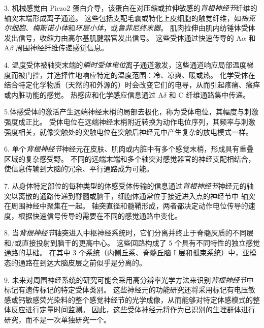 3. 机械感觉由 Piezo2 蛋白介导，该蛋白在对压缩或拉伸敏感的\textit{背根神经节}纤维的轴突末端形成离子通道。
这些包括支配毛囊或特化上皮细胞的触觉纤维，如\textit{梅克尔细胞}、\textit{梅斯诺小体}和\textit{环层小体}，或\textit{鲁菲尼终末器}。
肌肉拉伸由肌内纺锤体受体发出信号，收缩力由高尔基肌腱器官发出信号。
这些受体通过快速传导的 A$\alpha$ 和 A$\beta$ 周围神经纤维传递感觉信息。


4. 温度受体被轴突末端的\textit{瞬时受体电位}离子通道激发，这些通道响应局部温度梯度而被门控，并选择性地响应特定的温度范围：冷、凉爽、暖或热。
化学受体在结合特定化学物质（天然的和外源的）时会改变它们的电导，从而引起疼痛、瘙痒或内脏功能的感觉。
热感应和化学感应信息通过 A$\delta$ 和 C 纤维通路集中传递。 


5.体感受体的激活产生远端神经末梢的局部去极化，称为受体电位，其幅度与刺激强度成正比。
受体电位在远端神经末梢附近转换为动作电位序列，其频率与刺激强度相关，就像突触处的突触电位在突触后神经元中产生复杂的放电模式一样。


6. 单个\textit{背根神经节}神经元在皮肤、肌肉或内脏中有多个感觉末梢，形成具有重叠区域的复杂感受野。
不同的远端末端和多个轴突对感觉器官的神经支配相结合，使信息传输到大脑的冗余、平行通路成为可能。 


7. 从身体特定部位的每种类型的体感受体传输的信息通过\textit{背根神经节}神经元的轴突以离散的通路传递到脊髓或脑干，细胞体通常位于接近进入点的神经节中 轴突在周围神经中聚集在一起。
轴突直径和髓鞘形成，两者都决定动作电位传导的速度，根据快速信号传导的需要在不同的感觉通路中变化。


8. 当\textit{背根神经节}轴突进入中枢神经系统时，它们分离并终止于脊髓灰质的不同层和/或直接投射到脑干的更高中心。
这些回路构成了 5 个具有不同特性的独立感觉通路的基础。
在其中 3 个系统（内侧丘系、脊髓丘脑 I 层和孤束系统）中，亚模态的通路在到达大脑皮层之前似乎是分离的。


9. 未来对周围神经系统的研究可能会采用高分辨率光学方法来识别\textit{背根神经节}中标记有遗传标记的特定受体类别。
这些神经元的功能研究还将采用标记有电压敏感或钙敏感荧光染料的整个感觉神经节的光学成像，从而能够对特定体感模式的整体反应进行定量时间监测。
因此，这些受体神经元将作为已识别的生理群体进行研究，而不是一次单独研究一个。


